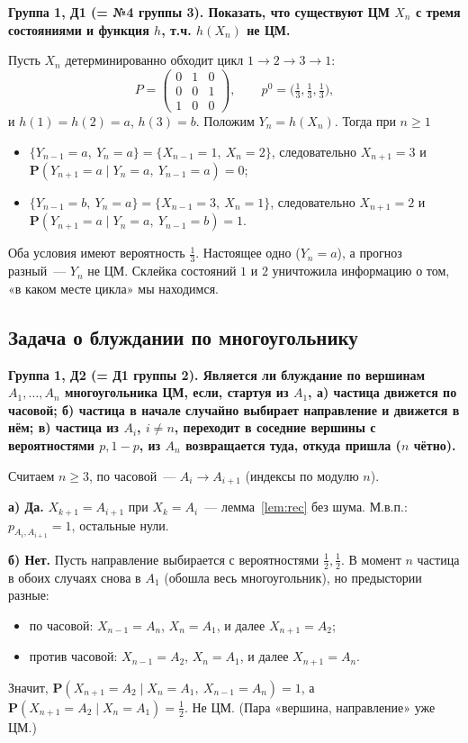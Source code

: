 \documentclass[11pt,a4paper]{article}
\theoremstyle{definition}
\newcommand{\PP}{\mathbf P}
\newcommand{\1}{\mathbf 1}
\newenvironment{task}[1]{\par\medskip\noindent\colorbox{black!7}{\parbox{\dimexpr\linewidth-2\fboxsep}{\textbf{#1}}}\par\smallskip}{\par}
\begin{document}
\begin{task}{Группа 1, Д1 (= №4 группы 3). Показать, что существуют ЦМ $X_n$ с
тремя состояниями и функция $h$, т.ч. $h(X_n)$ не ЦМ.}
\end{task}
Пусть $X_n$ детерминированно обходит цикл $1\to2\to3\to1$:
\[
P=\begin{pmatrix}0&1&0\\0&0&1\\1&0&0\end{pmatrix},\qquad p^0=\bigl(\tfrac13,\tfrac13,\tfrac13\bigr),
\]
и $h(1)=h(2)=a$, $h(3)=b$. Положим $Y_n=h(X_n)$. Тогда при $n\ge1$
\begin{itemize}[nosep]
\item $\{Y_{n-1}=a,\ Y_n=a\}=\{X_{n-1}=1,\ X_n=2\}$, следовательно $X_{n+1}=3$ и
$\PP(Y_{n+1}=a\mid Y_n=a,\ Y_{n-1}=a)=0$;
\item $\{Y_{n-1}=b,\ Y_n=a\}=\{X_{n-1}=3,\ X_n=1\}$, следовательно $X_{n+1}=2$ и
$\PP(Y_{n+1}=a\mid Y_n=a,\ Y_{n-1}=b)=1$.
\end{itemize}
Оба условия имеют вероятность $\frac13$. Настоящее одно ($Y_n=a$), а
прогноз разный~--- $Y_n$ не ЦМ. Склейка состояний $1$ и $2$ уничтожила
информацию о том, «в каком месте цикла» мы находимся.

\subsection{Задача о блуждании по многоугольнику}\label{z:polygon}

\begin{task}{Группа 1, Д2 (= Д1 группы 2). Является ли блуждание по вершинам
$A_1,\dots,A_n$ многоугольника ЦМ, если, стартуя из $A_1$, а) частица движется
по часовой; б) частица в начале случайно выбирает направление и движется в
нём; в) частица из $A_i$, $i\ne n$, переходит в соседние вершины с
вероятностями $p,1-p$, из $A_n$ возвращается туда, откуда пришла ($n$ чётно).}
\end{task}
Считаем $n\ge3$, по часовой~--- $A_i\to A_{i+1}$ (индексы по модулю $n$).

\textbf{а) Да.} $X_{k+1}=A_{i+1}$ при $X_k=A_i$~--- лемма~\ref{lem:rec} без шума.
М.в.п.: $p_{A_i,A_{i+1}}=1$, остальные нули.

\textbf{б) Нет.} Пусть направление выбирается с вероятностями
$\frac12,\frac12$. В момент $n$ частица в обоих случаях снова в $A_1$ (обошла
весь многоугольник), но предыстории разные:
\begin{itemize}[nosep]
\item по часовой: $X_{n-1}=A_n$, $X_n=A_1$, и далее $X_{n+1}=A_2$;
\item против часовой: $X_{n-1}=A_2$, $X_n=A_1$, и далее $X_{n+1}=A_n$.
\end{itemize}
Значит,
$\PP(X_{n+1}=A_2\mid X_n=A_1,\ X_{n-1}=A_n)=1$, а
$\PP(X_{n+1}=A_2\mid X_n=A_1)=\frac12$. Не ЦМ. (Пара «вершина, направление»
уже ЦМ.)
\end{document}
